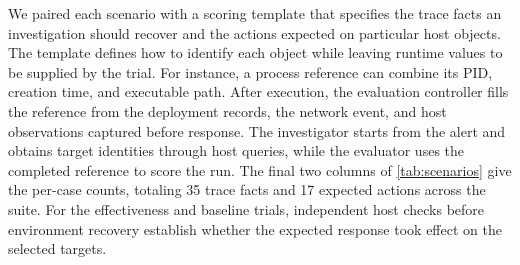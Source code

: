 \documentclass[pdflatex,sn-basic]{sn-jnl}
\begin{document}
We paired each scenario with a scoring template that specifies the trace facts an investigation should recover and the actions expected on particular host objects. The template defines how to identify each object while leaving runtime values to be supplied by the trial. For instance, a process reference can combine its PID, creation time, and executable path. After execution, the evaluation controller fills the reference from the deployment records, the network event, and host observations captured before response. The investigator starts from the alert and obtains target identities through host queries, while the evaluator uses the completed reference to score the run. The final two columns of \autoref{tab:scenarios} give the per-case counts, totaling 35 trace facts and 17 expected actions across the suite. For the effectiveness and baseline trials, independent host checks before environment recovery establish whether the expected response took effect on the selected targets.

\begingroup
\let\table\tableorg
\let\endtable\endtableorg
\begin{table}[htbp]
\centering
\caption{Overview of the eight Windows C2 test scenarios.}
\label{tab:scenarios}
\small
\renewcommand{\arraystretch}{1.15}
\setlength{\tabcolsep}{3pt}
\end{table}

\endgroup
\end{document}
